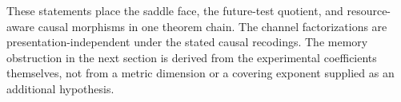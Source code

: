 These statements place the saddle face, the future-test quotient, and
resource-aware causal morphisms in one theorem chain. The channel
factorizations are presentation-independent under the stated causal
recodings. The memory obstruction in the next section is derived from
the experimental coefficients themselves, not from a metric dimension
or a covering exponent supplied as an additional hypothesis.
